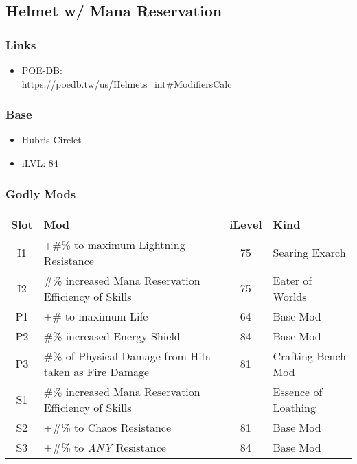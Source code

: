 \subsection{Helmet w/ Mana Reservation}
\subsubsection{Links}
\begin{itemize}
	\item POE-DB:\\
	\url{https://poedb.tw/us/Helmets_int#ModifiersCalc}
\end{itemize}

\subsubsection{Base}
\begin{itemize}
	\item Hubris Circlet
	\item iLVL: 84
\end{itemize}

\subsubsection{Godly Mods}
\begin{tabular}{|c|l|c|l|}
	\hline
	Slot&Mod&iLevel&Kind\\\hline
	I1& +\#\% to maximum Lightning Resistance&75& Searing Exarch \\\hline
	I2& \#\% increased Mana Reservation Efficiency of Skills&75& Eater of Worlds \\\hline\hline
	P1& +\# to maximum Life&64& Base Mod \\\hline
	P2& \#\% increased Energy Shield&84& Base Mod \\\hline
	P3&\#\% of Physical Damage from Hits taken as Fire Damage&81& Crafting Bench Mod \\\cline{2-4}
	S1&\#\% increased Mana Reservation Efficiency of Skills&&Essence of Loathing \\\hline
	S2&+\#\% to Chaos Resistance&81&Base Mod \\\hline
	S3&+\#\% to \emph{ANY} Resistance&84&Base Mod \\\hline
\end{tabular}

